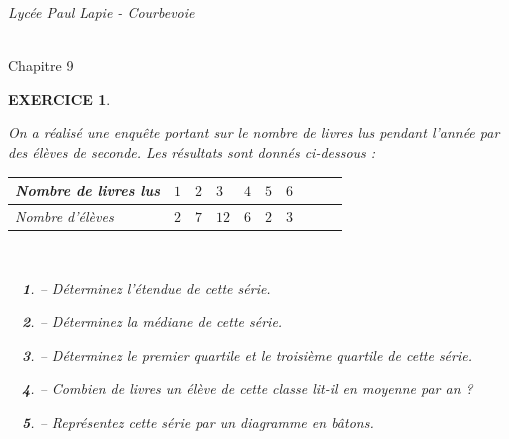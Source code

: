 \documentclass[a4paper]{article}   %
\renewcommand{\(}{\left(}
\renewcommand{\)}{\right)}
\newtheorem{ques}{~}
\newenvironment{qu}{\begin{ques}--} {\end{ques}}
\newtheorem{EXO}{\large EXERCICE }
\newenvironment{EX}   { \setcounter{ques}{0} \begin{EXO} \hrulefill ~\vspace{0.3cm}

\normalfont}    {\end{EXO} \medskip}
\def\cl{{\Large \bf{2nde}}}
\begin{document}
\newpage \setcounter{EXO}{0}

\noindent\begin{minipage}{.20\linewidth}\begin{center}                   %
\noindent \emph{Lycée Paul Lapie - Courbevoie}
\end{center}\end{minipage}
\begin{minipage}{1.5\linewidth}\begin{center}		%
\noindent \cl\\ Chapitre 9
\end{center}\end{minipage}

\begin{center} 		%
\end{center}
\large
\begin{EX}
On a réalisé une enquête portant sur le nombre de livres lus pendant l'année par des élèves de seconde. Les résultats sont donnés ci-dessous :
~~\\
\begin{center}
\begin{tabular}{|p{5cm}| p{1cm}|p{1cm}|p{1cm}|p{1cm}|p{1cm}|p{1cm}|p{1cm}|p{1cm}|p{1cm}|}		%
\hline							%
Nombre de livres lus & $1$&$2$&$3$&$4$&$5$&$6$ \\
\hline
Nombre d'élèves&$2$&$7$&$12$&$6$&$2$&$3$\\
\hline
\end{tabular}
\end{center}
~~\\
\begin{qu} Déterminez l'étendue de cette série.
\end{qu}

\begin{qu} Déterminez la médiane de cette série.
\end{qu}

\begin{qu} Déterminez le premier quartile et le troisième quartile de cette série.
\end{qu}

\begin{qu} Combien de livres un élève de cette classe lit-il en moyenne par an ?
\end{qu}

\begin{qu} Représentez cette série par un diagramme en bâtons.
\end{qu}

\end{EX}
\end{document}
